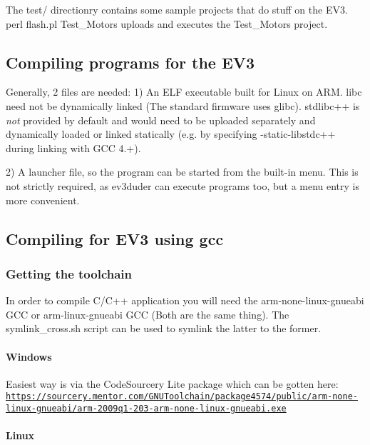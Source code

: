 The test/ directionry contains some sample projects that do stuff on the E\+V3. {\ttfamily perl flash.\+pl Test\+\_\+\+Motors} uploads and executes the Test\+\_\+\+Motors project.

\subsection*{Compiling programs for the E\+V3}

Generally, 2 files are needed\+: 1) An E\+L\+F executable built for Linux on A\+R\+M. libc need not be dynamically linked (The standard firmware uses glibc). stdlibc++ is {\itshape not} provided by default and would need to be uploaded separately and dynamically loaded or linked statically (e.\+g. by specifying -\/static-\/libstdc++ during linking with G\+C\+C 4.+).

2) A launcher file, so the program can be started from the built-\/in menu. This is not strictly required, as ev3duder can execute programs too, but a menu entry is more convenient.

\subsection*{Compiling for E\+V3 using gcc}

\subsubsection*{Getting the toolchain}

In order to compile C/\+C++ application you will need the arm-\/none-\/linux-\/gnueabi G\+C\+C or arm-\/linux-\/gnueabi G\+C\+C (Both are the same thing). The {\ttfamily symlink\+\_\+cross.\+sh} script can be used to symlink the latter to the former.

\paragraph*{Windows}

Easiest way is via the Code\+Sourcery Lite package which can be gotten here\+: \href{https://sourcery.mentor.com/GNUToolchain/package4574/public/arm-none-linux-gnueabi/arm-2009q1-203-arm-none-linux-gnueabi.exe}{\tt https\+://sourcery.\+mentor.\+com/\+G\+N\+U\+Toolchain/package4574/public/arm-\/none-\/linux-\/gnueabi/arm-\/2009q1-\/203-\/arm-\/none-\/linux-\/gnueabi.\+exe}

\paragraph*{Linux}

